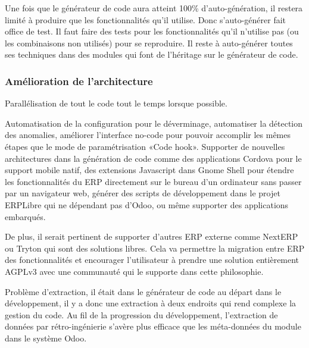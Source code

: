 


Une fois que le générateur de code aura atteint 100\% d’auto-génération, il restera limité à produire que les fonctionnalités qu’il utilise. Donc s’auto-générer fait office de test. Il faut faire des tests pour les fonctionnalités qu’il n’utilise pas (ou les combinaisons non utilisés) pour se reproduire. Il reste à auto-générer toutes ses techniques dans des modules qui font de l'héritage sur le générateur de code.


\subsubsection{Amélioration de l’architecture}
Parallélisation de tout le code tout le temps lorsque possible.

Automatisation de la configuration pour le déverminage, automatiser la détection des anomalies, améliorer l’interface no-code pour pouvoir accomplir les mêmes étapes que le mode de paramétrisation «Code hook». Supporter de nouvelles architectures dans la génération de code comme des applications Cordova pour le support mobile natif, des extensions Javascript dans Gnome Shell pour étendre les fonctionnalités du ERP directement sur le bureau d’un ordinateur sans passer par un navigateur web, générer des scripts de développement dans le projet ERPLibre qui ne dépendant pas d’Odoo, ou même supporter des applications embarqués.

De plus, il serait pertinent de supporter d’autres ERP externe comme NextERP ou Tryton qui sont des solutions libres. Cela va permettre la migration entre ERP des fonctionnalités et encourager l’utilisateur à prendre une solution entièrement AGPLv3 avec une communauté qui le supporte dans cette philosophie.

Problème d’extraction, il était dans le générateur de code au départ dans le développement, il y a donc une extraction à deux endroits qui rend complexe la gestion du code. Au fil de la progression du développement, l’extraction de données par rétro-ingénierie s’avère plus efficace que les méta-données du module dans le système Odoo.

